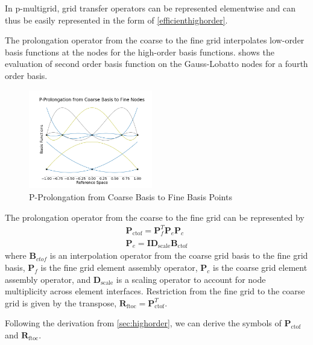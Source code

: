 \documentclass[review]{siamart190516}
\begin{document}
In p-multigrid, grid transfer operators can be represented elementwise and can thus be easily represented in the form of \cref{efficienthighorder}.

The prolongation operator from the coarse to the fine grid interpolates low-order basis functions at the nodes for the high-order basis functions.
 shows the evaluation of second order basis function on the Gauss-Lobatto nodes for a fourth order basis.

\begin{figure}[!ht]
  \centering
  \includegraphics[width=0.48\textwidth]{img/pProlongation}
  \caption{P-Prolongation from Coarse Basis to Fine Basis Points}
  \label{fig:p_prolongation}
\end{figure}

The prolongation operator from the coarse to the fine grid can be represented by
\begin{equation}
\begin{split}
\mathbf{P}_{\text{ctof}} = \mathbf{P}_f^T \mathbf{P}_e \mathbf{P}_c\\
\mathbf{P}_e = \mathbf{I} \mathbf{D}_{\text{scale}} \mathbf{B}_{\text{ctof}}
\end{split}
\end{equation}
where $\mathbf{B}_{ctof}$ is an interpolation operator from the coarse grid basis to the fine grid basis, $\mathbf{P}_f$ is the fine grid element assembly operator, $\mathbf{P}_c$ is the coarse grid element assembly operator, and $\mathbf{D}_{\text{scale}}$ is a scaling operator to account for node multiplicity across element interfaces.
Restriction from the fine grid to the coarse grid is given by the transpose, $\mathbf{R}_{\text{ftoc}} = \mathbf{P}_{\text{ctof}}^T$.

Following the derivation from \cref{sec:highorder}, we can derive the symbols of $\mathbf{P}_{\text{ctof}}$ and $\mathbf{R}_{\text{ftoc}}$.
\end{document}
